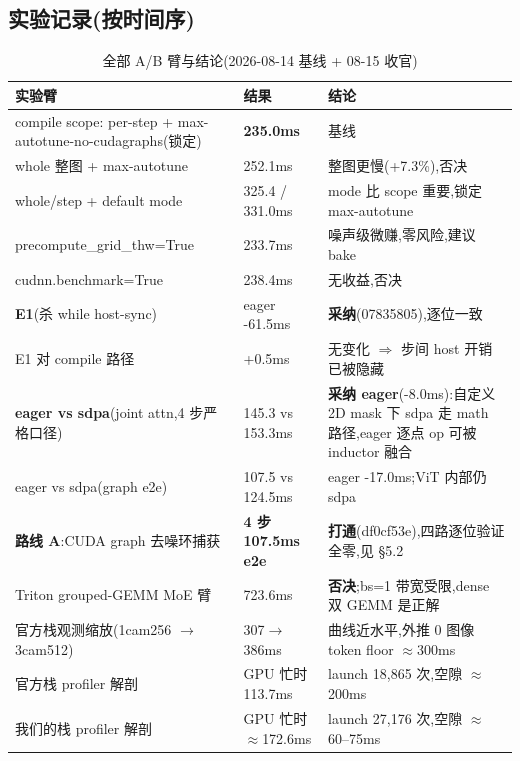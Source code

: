 \documentclass[11pt]{ctexart}
\begin{document}
\subsection{实验记录(按时间序)}
\begin{table}[htbp]
\centering\footnotesize
\caption{全部 A/B 臂与结论(2026-08-14 基线 + 08-15 收官)}
\begin{tabular}{@{}p{4.8cm}p{2.6cm}p{6.6cm}@{}}
\toprule
实验臂 & 结果 & 结论 \\
\midrule
compile scope: per-step + max-autotune-no-cudagraphs(锁定) & \textbf{235.0ms} & 基线 \\
\quad whole 整图 + max-autotune & 252.1ms & 整图更慢(+7.3\%),否决 \\
\quad whole/step + default mode & 325.4 / 331.0ms & mode 比 scope 重要,锁定 max-autotune \\
\midrule
precompute\_grid\_thw=True & 233.7ms & 噪声级微赚,零风险,建议 bake \\
cudnn.benchmark=True & 238.4ms & 无收益,否决 \\
\midrule
\textbf{E1}(杀 while host-sync) & eager -61.5ms & \textbf{采纳}(07835805),逐位一致 \\
E1 对 compile 路径 & +0.5ms & 无变化 $\Rightarrow$ 步间 host 开销已被隐藏 \\
\midrule
\textbf{eager vs sdpa}(joint attn,4 步严格口径) & 145.3 vs 153.3ms & \textbf{采纳 eager}(-8.0ms):自定义 2D mask 下 sdpa 走 math 路径,eager 逐点 op 可被 inductor 融合 \\
\quad eager vs sdpa(graph e2e) & 107.5 vs 124.5ms & eager -17.0ms;ViT 内部仍 sdpa \\
\midrule
\textbf{路线 A}:CUDA graph 去噪环捕获 & \textbf{4 步 107.5ms e2e} & \textbf{打通}(df0cf53e),四路逐位验证全零,见 §5.2 \\
\midrule
Triton grouped-GEMM MoE 臂 & 723.6ms & \textbf{否决};bs=1 带宽受限,dense 双 GEMM 是正解 \\
\midrule
官方栈观测缩放(1cam256 $\to$ 3cam512) & 307$\to$386ms & 曲线近水平,外推 0 图像 token floor $\approx$300ms \\
官方栈 profiler 解剖 & GPU 忙时 113.7ms & launch 18,865 次,空隙 $\approx$200ms \\
我们的栈 profiler 解剖 & GPU 忙时 $\approx$172.6ms & launch 27,176 次,空隙 $\approx$60--75ms \\
\bottomrule
\end{tabular}
\end{table}
\end{document}
